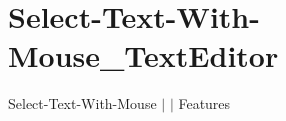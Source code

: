 \chapter{Select-\/\+Text-\/\+With-\/\+Mouse\+\_\+\+Text\+Editor }
\hypertarget{md__docs_2_text_editor_2_features_2_select-_text-_with-_mouse___text_editor}{}\label{md__docs_2_text_editor_2_features_2_select-_text-_with-_mouse___text_editor}
Select-\/\+Text-\/\+With-\/\+Mouse \texorpdfstring{$\vert$}{|}  \texorpdfstring{$\vert$}{|} Features



 